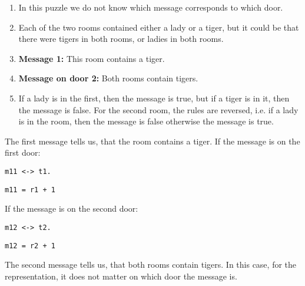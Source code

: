 \begin{enumerate}

\item In this puzzle we do not know which message corresponds to which door.

\item Each of the two rooms contained either a lady or a tiger, but it could be that there were tigers in both rooms, or ladies in both rooms.

\item \textbf{Message 1:} This room contains a tiger.

\item \textbf{Message on door 2:} Both rooms contain tigers.


\item If a lady is in the first, then the message is true, but if a tiger is in it, then the message is false. For the second room, the rules are reversed, i.e. if a lady is in the room, then the message is false otherwise the message is true.

\end{enumerate}

The first message tells us, that the room contains a tiger.
If the message is on the first door:


\begin{multicols}{2}
\begin{lstlisting}[numbers=none,title=Propositional logic]
m11 <-> t1.

\end{lstlisting}

\begin{lstlisting}[numbers=none,title=Modular arithmetics]
m11 = r1 + 1
\end{lstlisting}
\end{multicols}


If the message is on the second door:

\begin{multicols}{2}
\begin{lstlisting}[numbers=none,title=Propositional logic]
m12 <-> t2.

\end{lstlisting}

\begin{lstlisting}[numbers=none,title=Modular arithmetics]
m12 = r2 + 1
\end{lstlisting}
\end{multicols}

The second message tells us, that both rooms contain tigers.
In this case, for the representation, it does not matter on which door the message is. 

